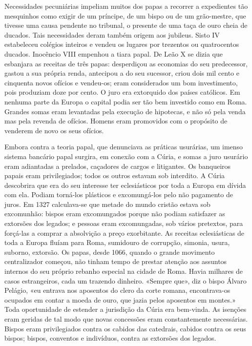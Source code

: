 \documentclass[11pt,a5paper,twoside,openany]{book}
\begin{document}
Necessidades pecuniárias impeliam muitos dos papas a recorrer a expedientes tão mesquinhos como exigir de um príncipe, de um bispo ou de um grão-mestre, que tivesse uma causa pendente no tribunal, o presente de uma taça de ouro cheia de ducados. Tais necessidades deram também origem aos jubileus. Sisto IV estabeleceu colégios inteiros e vendeu os lugares por trezentos ou quatrocentos ducados. Inocêncio VIII empenhou a tiara papal. De Leão X se dizia que esbanjara as receitas de três papas: desperdiçou as economias do seu predecessor, gastou a sua própria renda, antecipou a do seu sucessor, criou dois mil cento e cinquenta novos ofícios e vendeu-os; eram considerados um bom investimento, pois produziam doze por cento. O juro era extorquido dos países católicos. Em nenhuma parte da Europa o capital podia ser tão bem investido como em Roma. Grandes somas eram levantadas pela execução de hipotecas, e não só pela venda mas pela revenda de ofícios. Homens eram promovidos com o propósito de venderem de novo os seus ofícios.

Embora contra a teoria papal, que denunciava as práticas usurárias, um imenso sistema bancário papal surgira, em conexão com a Cúria, e somas a juro usurário eram adiantadas a prelados, caçadores de cargos e litigantes. Os banqueiros papais eram privilegiados; todos os outros estavam sob interdito. A Cúria descobrira que era do seu interesse ter eclesiásticos por toda a Europa em dívida com ela. Podiam torná-los plásticos e excomungá-los pelo não pagamento de juros. Em 1327 calculava-se que metade do mundo cristão estava sob excomunhão: bispos eram excomungados porque não podiam satisfazer as extorsões dos legados; e pessoas eram excomungadas, sob vários pretextos, para forçá-las a comprar a absolvição a preço exorbitante. As receitas eclesiásticas de toda a Europa fluíam para Roma, sumidouro de corrupção, simonia, usura, suborno, extorsão. Os papas, desde 1066, quando o grande movimento centralizador começou, não tinham tempo de prestar atenção aos assuntos internos do seu próprio rebanho especial na cidade de Roma. Havia milhares de casos estrangeiros, cada um trazendo dinheiro. «Sempre que», diz o bispo Álvaro Pelágio, «eu entrava nos aposentos do clero da corte romana, encontrava-os ocupados em contar a moeda de ouro, que jazia pelos aposentos em montes.» Toda oportunidade de estender a jurisdição da Cúria era bem-vinda. As isenções eram geridas de tal modo que novas concessões eram constantemente necessárias. Bispos eram privilegiados contra os cabidos das catedrais, cabidos contra os seus bispos; bispos, conventos e indivíduos, contra as extorsões dos legados.
\end{document}

